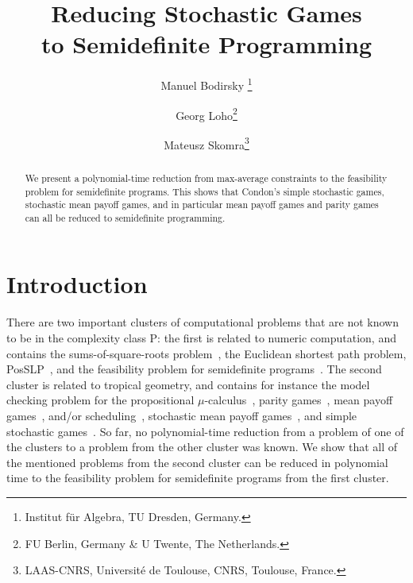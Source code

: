 \documentclass[11pt]{article}
\title{Reducing Stochastic Games \\
to Semidefinite Programming}
\author{Manuel Bodirsky
\thanks{Institut f\"ur Algebra, TU Dresden, Germany.} 
\and Georg Loho\thanks{FU Berlin, Germany \& U Twente, The Netherlands.}  \and Mateusz Skomra\thanks{LAAS-CNRS, Université de Toulouse, CNRS, Toulouse, France.}}
\date{}
\theoremstyle{definition}
\theoremstyle{remark}
\begin{document}
\maketitle


\begin{abstract}
    We present a polynomial-time reduction from max-average constraints to the feasibility problem for semidefinite programs. This shows that Condon's simple stochastic games, stochastic mean payoff games, and in particular mean payoff games and parity games can all be reduced to semidefinite programming. 
\end{abstract}






\section{Introduction}
There are two important clusters of computational problems that are not known to be in the complexity class P: the first is related to numeric computation, and contains the sums-of-square-roots problem~\cite{GGJ76,Eisenbrand2024}, the Euclidean shortest path problem, PosSLP~\cite{ABKM08}, and the feasibility problem for semidefinite programs~\cite{nesterovnemirovskibook,Ramana}. The second cluster is related to tropical geometry, and contains for instance the model checking problem for the propositional $\mu$-calculus~\cite{EmersonJutla,emerson_jutla_sistla}, parity games~\cite{MartinBorel,MostkowskiGames}, mean payoff games~\cite{EhrenfeuchtMycielski}, and/or scheduling~\cite{and-or-scheduling}, stochastic mean payoff games~\cite{andersson_miltersen}, and simple stochastic games~\cite{condon}.
So far, no polynomial-time reduction from a problem of one of the clusters to a problem from the other cluster was known. We show that all of the mentioned problems from the second cluster can be reduced in polynomial time 
to the feasibility problem for semidefinite programs from the first cluster. 
\end{document}
